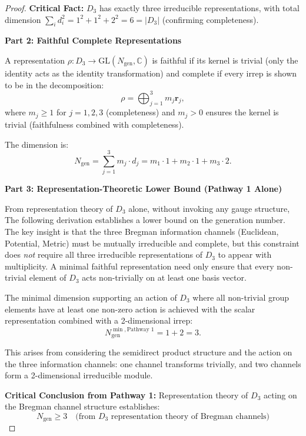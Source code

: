 \begin{theorem}
\begin{proof}
\textbf{Critical Fact:} $D_3$ has exactly three irreducible representations, with total dimension $\sum_i d_i^2 = 1^2 + 1^2 + 2^2 = 6 = |D_3|$ (confirming completeness).

\textbf{Part 2: Faithful Complete Representations}

A representation $\rho: D_3 \to \mathrm{GL}(N_{\mathrm{gen}}, \mathbb{C})$ is faithful if its kernel is trivial (only the identity acts as the identity transformation) and complete if every irrep is shown to be in the decomposition:
\begin{equation}
\rho = \bigoplus_{j=1}^{3} m_j \mathbf{r}_j,
\end{equation}
where $m_j \geq 1$ for $j = 1, 2, 3$ (completeness) and $m_j > 0$ ensures the kernel is trivial (faithfulness combined with completeness).

The dimension is:
\begin{equation}
N_{\mathrm{gen}} = \sum_{j=1}^{3} m_j \cdot d_j = m_1 \cdot 1 + m_2 \cdot 1 + m_3 \cdot 2.
\end{equation}

\textbf{Part 3: Representation-Theoretic Lower Bound (Pathway 1 Alone)}

From representation theory of $D_3$ alone, without invoking any gauge structure, The following derivation establishes a lower bound on the generation number. The key insight is that the three Bregman information channels (Euclidean, Potential, Metric) must be mutually irreducible and complete, but this constraint does \emph{not} require all three irreducible representations of $D_3$ to appear with multiplicity. A minimal faithful representation need only ensure that every non-trivial element of $D_3$ acts non-trivially on at least one basis vector.

The minimal dimension supporting an action of $D_3$ where all non-trivial group elements have at least one non-zero action is achieved with the scalar representation combined with a 2-dimensional irrep:
\begin{equation}
N_{\mathrm{gen}}^{\min, \text{Pathway 1}} = 1 + 2 = 3.
\end{equation}

This arises from considering the semidirect product structure and the action on the three information channels: one channel transforms trivially, and two channels form a 2-dimensional irreducible module.

\textbf{Critical Conclusion from Pathway 1:} Representation theory of $D_3$ acting on the Bregman channel structure establishes:
\begin{equation}
\boxed{N_{\text{gen}} \geq 3 \quad \text{(from $D_3$ representation theory of Bregman channels)}}
\end{equation}


\end{proof}
\end{theorem}
